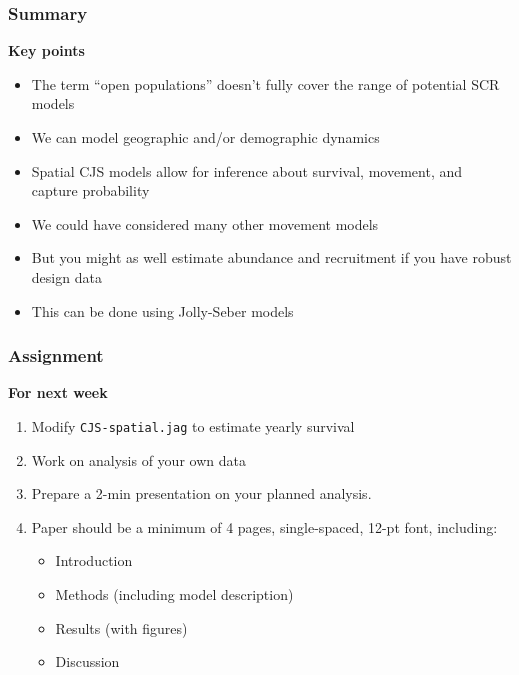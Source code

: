 \documentclass[color=usenames,dvipsnames]{beamer}\usepackage[]{graphicx}\usepackage[]{color}
\begin{document}
\begin{frame}
  \frametitle{Summary}
  \large
  {\bf Key points}
  \begin{itemize}[<+->]
    \item The term ``open populations'' doesn't fully cover the range
      of potential SCR models
    \item We can model geographic and/or demographic dynamics
    \item Spatial CJS models allow for inference about survival,
      movement, and capture probability
    \item We could have considered many other movement models
    \item But you might as well estimate abundance and recruitment if
      you have robust design data
    \item This can be done using Jolly-Seber models
  \end{itemize}
\end{frame}



\begin{frame}
  \frametitle{Assignment}
  {\bf \large For next week}
  \begin{enumerate}[\bf (1)]
    \item Modify {\tt CJS-spatial.jag} to estimate yearly survival
    \item Work on analysis of your own data
    \item Prepare a 2-min presentation on your planned analysis.
    \item Paper should be a minimum of 4 pages, single-spaced, 12-pt
      font, including:
      \begin{itemize}
        \item Introduction
        \item Methods (including model description)
        \item Results (with figures)
        \item Discussion
      \end{itemize}
  \end{enumerate}
\end{frame}
\end{document}
